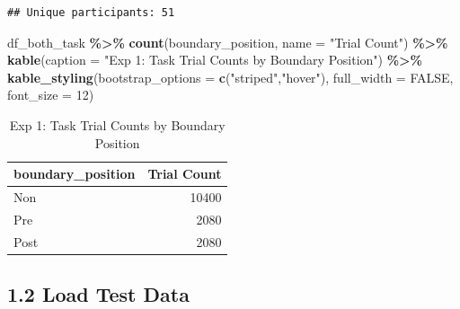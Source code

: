 \documentclass[
]{article}
\newenvironment{Shaded}{\begin{snugshade}}{\end{snugshade}}
\newcommand{\AttributeTok}[1]{\textcolor[rgb]{0.13,0.29,0.53}{#1}}
\newcommand{\CommentTok}[1]{\textcolor[rgb]{0.56,0.35,0.01}{\textit{#1}}}
\newcommand{\ConstantTok}[1]{\textcolor[rgb]{0.56,0.35,0.01}{#1}}
\newcommand{\DecValTok}[1]{\textcolor[rgb]{0.00,0.00,0.81}{#1}}
\newcommand{\FunctionTok}[1]{\textcolor[rgb]{0.13,0.29,0.53}{\textbf{#1}}}
\newcommand{\NormalTok}[1]{#1}
\newcommand{\OtherTok}[1]{\textcolor[rgb]{0.56,0.35,0.01}{#1}}
\newcommand{\SpecialCharTok}[1]{\textcolor[rgb]{0.81,0.36,0.00}{\textbf{#1}}}
\newcommand{\StringTok}[1]{\textcolor[rgb]{0.31,0.60,0.02}{#1}}
\begin{document}
\begin{verbatim}
## Unique participants: 51
\end{verbatim}

\begin{Shaded}
\begin{Highlighting}[]
\NormalTok{df\_both\_task }\SpecialCharTok{\%\textgreater{}\%}
  \FunctionTok{count}\NormalTok{(boundary\_position, }\AttributeTok{name =} \StringTok{"Trial Count"}\NormalTok{) }\SpecialCharTok{\%\textgreater{}\%}
  \FunctionTok{kable}\NormalTok{(}\AttributeTok{caption =} \StringTok{"Exp 1: Task Trial Counts by Boundary Position"}\NormalTok{) }\SpecialCharTok{\%\textgreater{}\%}
  \FunctionTok{kable\_styling}\NormalTok{(}\AttributeTok{bootstrap\_options =} \FunctionTok{c}\NormalTok{(}\StringTok{"striped"}\NormalTok{,}\StringTok{"hover"}\NormalTok{), }\AttributeTok{full\_width =} \ConstantTok{FALSE}\NormalTok{, }\AttributeTok{font\_size =} \DecValTok{12}\NormalTok{)}
\end{Highlighting}
\end{Shaded}

\begingroup\fontsize{12}{14}\selectfont

\begin{longtable}[t]{lr}
\caption{\label{tab:exp1_task_count}Exp 1: Task Trial Counts by Boundary Position}\\
\toprule
boundary\_position & Trial Count\\
\midrule
Non & 10400\\
Pre & 2080\\
Post & 2080\\
\bottomrule
\end{longtable}
\endgroup{}

\subsection{1.2 Load Test Data}\label{load-test-data}

\begin{Shaded}
\end{Shaded}
\end{document}
